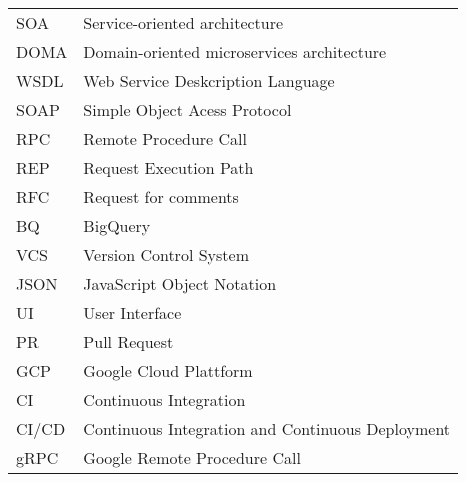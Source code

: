 \begin{tabular}{ll}
SOA          & Service-oriented architecture \\
DOMA         & Domain-oriented microservices architecture \\
WSDL         & Web Service Deskcription Language \\
SOAP         & Simple Object Acess Protocol \\
RPC          & Remote Procedure Call \\
REP          & Request Execution Path \\
RFC          & Request for comments \\
BQ           & BigQuery \\
VCS          & Version Control System\\
JSON         & JavaScript Object Notation\\
UI           & User Interface\\
PR           & Pull Request\\
GCP          & Google Cloud Plattform\\
CI           & Continuous Integration\\
CI/CD        & Continuous Integration and Continuous Deployment\\
gRPC         & Google Remote Procedure Call\\

\end{tabular}